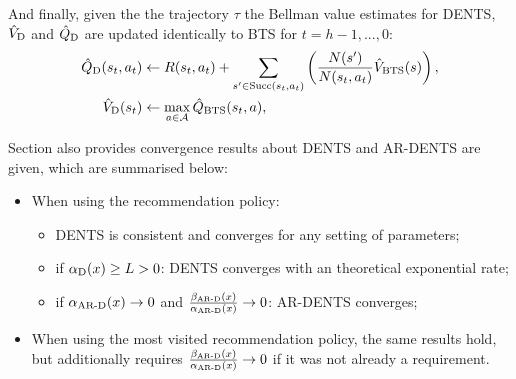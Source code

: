         And finally, given the the trajectory $\tau$ the Bellman value estimates for DENTS, ${\hat{V}_{{\textnormal{D}}}}$ and ${\hat{Q}_{{\textnormal{D}}}}$ are updated identically to BTS for $t=h-1,...,0$:
        \begin{align}
            {\hat{Q}_{{\textnormal{D}}}}(s_t,a_t) &\leftarrow 
                R(s_t,a_t) + \sum_{s' \in {\textnormal{Succ}(s_t,a_t)}} \left( \frac{N(s')}{N(s_t,a_t)} {\hat{V}_{{\textnormal{BTS}}}}(s) \right), 
                        \label{eq:dents_q_backup} \\ 
            {\hat{V}_{{\textnormal{D}}}}(s_t) &\leftarrow \max_{a\in\mathcal{A}} {\hat{Q}_{{\textnormal{BTS}}}}(s_t,a), 
                        \label{eq:dents_v_backup} 
        \end{align}


        










        Section  also provides convergence results about DENTS and AR-DENTS are given, which are summarised below:
        \begin{itemize}
            \item When using the  recommendation policy:
            \begin{itemize}
                \item DENTS is consistent and converges for any setting of parameters;
                \item if ${\alpha_{{\textnormal{D}}}}(x) \geq L > 0$: DENTS converges with an theoretical exponential rate;
                \item if ${\alpha_{{\textnormal{AR-D}}}}(x) \rightarrow 0$ and $\frac{{\beta_{{\textnormal{AR-D}}}}(x)}{{\alpha_{{\textnormal{AR-D}}}}(x)} \rightarrow 0$: AR-DENTS converges;
            \end{itemize}
            \item When using the most visited recommendation policy, the same results hold, but additionally requires $\frac{{\beta_{{\textnormal{AR-D}}}}(x)}{{\alpha_{{\textnormal{AR-D}}}}(x)} \rightarrow 0$ if it was not already a requirement. 
        \end{itemize}



